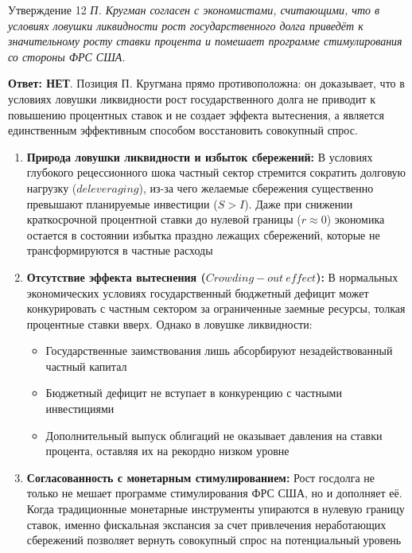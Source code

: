 \documentclass[10pt,a4paper]{article}
\newcommand{\qnet}{\textbf{\color{nored}Ответ: НЕТ}}
\newenvironment{answer}[2]{%
  \begin{qbox}{Утверждение #1}
  \textit{#2}\par\smallskip
}{%
  \end{qbox}\vspace{2pt}
}
\begin{document}
\begin{answer}{12}{П. Кругман согласен с экономистами, считающими, что в условиях ловушки ликвидности рост государственного долга приведёт к значительному росту ставки процента и помешает программе стимулирования со стороны ФРС США.}
\qnet. Позиция П. Кругмана прямо противоположна: он доказывает, что в условиях ловушки ликвидности рост государственного долга не приводит к повышению процентных ставок и не создает эффекта вытеснения, а является единственным эффективным способом восстановить совокупный спрос.

\begin{enumerate}
    \item \textbf{Природа ловушки ликвидности и избыток сбережений:}
    В условиях глубокого рецессионного шока частный сектор стремится сократить долговую нагрузку ($deleveraging$), из-за чего желаемые сбережения существенно превышают планируемые инвестиции ($S > I$). Даже при снижении краткосрочной процентной ставки до нулевой границы ($r \approx 0$) экономика остается в состоянии избытка праздно лежащих сбережений, которые не трансформируются в частные расходы

    \item \textbf{Отсутствие эффекта вытеснения ($Crowding-out\ effect$):}
    В нормальных экономических условиях государственный бюджетный дефицит может конкурировать с частным сектором за ограниченные заемные ресурсы, толкая процентные ставки вверх. Однако в ловушке ликвидности:
    \begin{itemize}
        \item Государственные заимствования лишь абсорбируют незадействованный частный капитал
        \item Бюджетный дефицит не вступает в конкуренцию с частными инвестициями
        \item Дополнительный выпуск облигаций не оказывает давления на ставки процента, оставляя их на рекордно низком уровне
    \end{itemize}

    \item \textbf{Согласованность с монетарным стимулированием:}
    Рост госдолга не только не мешает программе стимулирования ФРС США, но и дополняет её. Когда традиционные монетарные инструменты упираются в нулевую границу ставок, именно фискальная экспансия за счет привлечения неработающих сбережений позволяет вернуть совокупный спрос на потенциальный уровень
\end{enumerate}
\end{answer}
\end{document}

